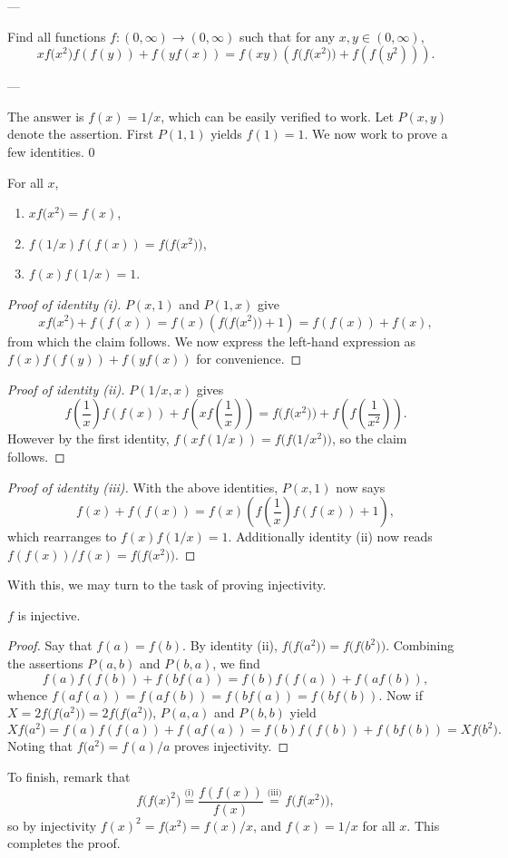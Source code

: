 
---

Find all functions $f:(0,\infty)\to(0,\infty)$ such that for any $x,y\in(0,\infty)$, \[xf\big(x^2\big)f(f(y))+f(yf(x))=f(xy)\left(f\big(f\big(x^2\big)\big)+f(f(y^2))\right).\]

---

The answer is $f(x)=1/x$, which can be easily verified to work. Let $P(x,y)$ denote the assertion. First $P(1,1)$ yields $f(1)=1$. We now work to prove a few identities.
\setcounter{iclaim}0
\begin{iclaim}
    For all $x$,
    \begin{enumerate}[label=(\roman*),itemsep=0em]
        \item $xf\big(x^2\big)=f(x)$,
        \item $f(1/x)f(f(x))=f\big(f\big(x^2\big)\big)$,
        \item $f(x)f(1/x)=1$.
    \end{enumerate}
\end{iclaim}
\begin{proof}[Proof of identity \emph{(i)}]
    $P(x,1)$ and $P(1,x)$ give \[xf\big(x^2\big)+f(f(x))=f(x)\left(f\big(f\big(x^2\big)\big)+1\right)=f(f(x))+f(x),\]
    from which the claim follows. We now express the left-hand expression as $f(x)f(f(y))+f(yf(x))$ for convenience.
\end{proof}
\begin{proof}[Proof of identity \emph{(ii)}]
    $P(1/x,x)$ gives \[f\left(\frac1x\right)f(f(x))+f\left(xf\left(\frac1x\right)\right)=f\big(f\big(x^2\big)\big)+f\left(f\left(\frac1{x^2}\right)\right).\]
    However by the first identity, $f(xf(1/x))=f\big(f\big(1/x^2\big)\big)$, so the claim follows.
\end{proof}
\begin{proof}[Proof of identity \emph{(iii)}]
    With the above identities, $P(x,1)$ now says \[f(x)+f(f(x))=f(x)\left(f\left(\frac1x\right)f(f(x))+1\right),\]
    which rearranges to $f(x)f(1/x)=1$. Additionally identity (ii) now reads $f(f(x))/f(x)=f\big(f\big(x^2\big)\big)$.
\end{proof}

With this, we may turn to the task of proving injectivity.
\begin{iclaim}
    $f$ is injective.
\end{iclaim}
\begin{proof}
    Say that $f(a)=f(b)$. By identity (ii), $f\big(f\big(a^2\big)\big)=f\big(f\big(b^2\big)\big)$. Combining the assertions $P(a,b)$ and $P(b,a)$, we find \[f(a)f(f(b))+f(bf(a))=f(b)f(f(a))+f(af(b)),\]
    whence $f(af(a))=f(af(b))=f(bf(a))=f(bf(b))$. Now if $X=2f\big(f\big(a^2\big)\big)=2f\big(f\big(a^2\big)\big)$, $P(a,a)$ and $P(b,b)$ yield \[Xf\big(a^2\big)=f(a)f(f(a))+f(af(a))=f(b)f(f(b))+f(bf(b))=Xf\big(b^2\big).\]
    Noting that $f\big(a^2\big)=f(a)/a$ proves injectivity.
\end{proof}

To finish, remark that \[f\big(f\big(x\big)^2\big)\stackrel{\text{(i)}}=\frac{f(f(x))}{f(x)}\stackrel{\text{(iii)}}=f\big(f\big(x^2\big)\big),\]
so by injectivity $f(x)^2=f\big(x^2\big)=f(x)/x$, and $f(x)=1/x$ for all $x$. This completes the proof.

